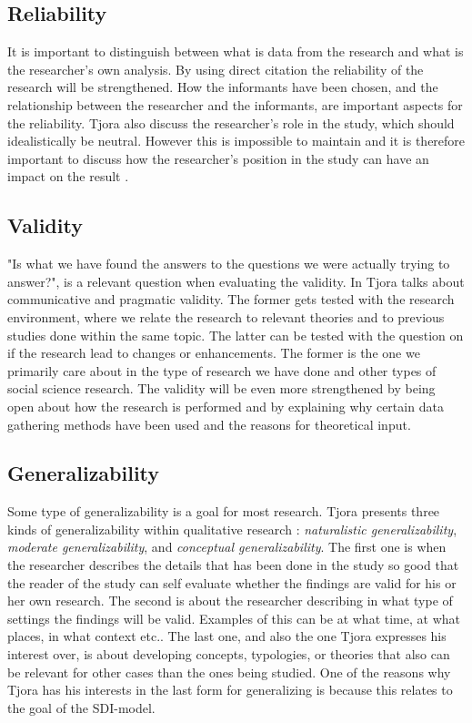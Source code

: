 \subsection{Reliability}
It is important to distinguish between what is data from the research and what is the researcher's own analysis. By using direct citation the reliability of the research will be strengthened. How the informants have been chosen, and the relationship between the researcher and the informants, are important aspects for the reliability. Tjora also discuss the researcher's role in the study, which should idealistically be neutral. However this is impossible to maintain and it is therefore important to discuss how the researcher's position in the study can have an impact on the result \cite{tjora}.

\subsection{Validity}
"Is what we have found the answers to the questions we were actually trying to answer?", is a relevant question when evaluating the validity. In \cite{tjora} Tjora talks about communicative and pragmatic validity. The former gets tested with the research environment, where we relate the research to relevant theories and to previous studies done within the same topic. The latter can be tested with the question on if the research lead to changes or enhancements. The former is the one we primarily care about in the type of research we have done and other types of social science research. The validity will be even more strengthened by being open about how the research is performed and by explaining why certain data gathering methods have been used and the reasons for theoretical input. 

\subsection{Generalizability}
Some type of generalizability is a goal for most research. Tjora presents three kinds of generalizability within qualitative research \cite{tjora}: \emph{naturalistic generalizability}, \emph{moderate generalizability}, and \emph{conceptual generalizability}. The first one is when the researcher describes the details that has been done in the study so good that the reader of the study can self evaluate whether the findings are valid for his or her own research. The second is about the researcher describing in what type of settings the findings will be valid. Examples of this can be at what time, at what places, in what context etc.. The last one, and also the one Tjora expresses his interest over, is about developing concepts, typologies, or theories that also can be relevant for other cases than the ones being studied. One of the reasons why Tjora has his interests in the last form for generalizing is because this relates to the goal of the SDI-model.

